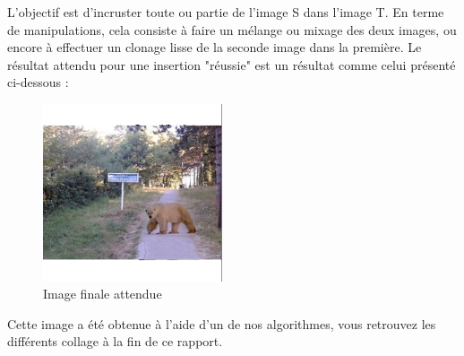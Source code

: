 L'objectif est d'incruster toute ou partie de l'image S dans l'image T. En terme de manipulations, cela consiste à faire un mélange ou mixage des deux images, ou encore à effectuer un clonage lisse de la seconde image dans la première.
Le résultat attendu pour une insertion "réussie" est un résultat comme celui présenté ci-dessous : 
    
\begin{center}
\begin{figure}[!htb]
   \centering
     \includegraphics[width = 150pt]{Annexe/OursD.png}
     \caption{Image  finale attendue}
\end{figure}
\end{center}
Cette image a été obtenue à l'aide d'un de nos algorithmes, vous retrouvez les différents collage à la fin de ce rapport.\newline

